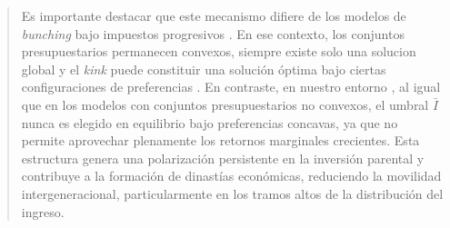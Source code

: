 \documentclass[12pt]{article}
\begin{document}
\begin{abstract}
Es importante destacar que este mecanismo difiere de los modelos de \emph{bunching} bajo impuestos progresivos \parencite{Saez_2010}. En ese contexto, los conjuntos presupuestarios permanecen convexos, siempre existe solo una solucion global y el \emph{kink} puede constituir una solución óptima bajo ciertas configuraciones de preferencias . En contraste, en nuestro entorno , al igual que en los modelos con conjuntos presupuestarios no convexos, el umbral $\bar I$ nunca es elegido en equilibrio bajo preferencias concavas, ya que no permite aprovechar plenamente los retornos marginales crecientes. Esta estructura genera una polarización persistente en la inversión parental y contribuye a la formación de dinastías económicas, reduciendo la movilidad intergeneracional, particularmente en los tramos altos de la distribución del ingreso.


\begin{figure}[ht]
\centering
{}
\end{figure}
\end{abstract}
\end{document}
